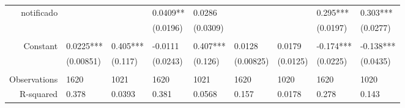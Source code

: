 \begin{tabular}{rrrrrrrrr}
notificado & \multicolumn{1}{l}{} & \multicolumn{1}{l}{} & \multicolumn{1}{l}{0.0409**} & \multicolumn{1}{l}{0.0286} & \multicolumn{1}{l}{} & \multicolumn{1}{l}{} & \multicolumn{1}{l}{0.295***} & \multicolumn{1}{l}{0.303***} \\
      & \multicolumn{1}{l}{} & \multicolumn{1}{l}{} & \multicolumn{1}{l}{(0.0196)} & \multicolumn{1}{l}{(0.0309)} & \multicolumn{1}{l}{} & \multicolumn{1}{l}{} & \multicolumn{1}{l}{(0.0197)} & \multicolumn{1}{l}{(0.0277)} \\
      & \multicolumn{1}{l}{} & \multicolumn{1}{l}{} & \multicolumn{1}{l}{} & \multicolumn{1}{l}{} & \multicolumn{1}{l}{} & \multicolumn{1}{l}{} & \multicolumn{1}{l}{} & \multicolumn{1}{l}{} \\
Constant & \multicolumn{1}{l}{0.0225***} & \multicolumn{1}{l}{0.405***} & \multicolumn{1}{l}{-0.0111} & \multicolumn{1}{l}{0.407***} & \multicolumn{1}{l}{0.0128} & \multicolumn{1}{l}{0.0179} & \multicolumn{1}{l}{-0.174***} & \multicolumn{1}{l}{-0.138***} \\
      & \multicolumn{1}{l}{(0.00851)} & \multicolumn{1}{l}{(0.117)} & \multicolumn{1}{l}{(0.0243)} & \multicolumn{1}{l}{(0.126)} & \multicolumn{1}{l}{(0.00825)} & \multicolumn{1}{l}{(0.0125)} & \multicolumn{1}{l}{(0.0225)} & \multicolumn{1}{l}{(0.0435)} \\
      & \multicolumn{1}{l}{} & \multicolumn{1}{l}{} & \multicolumn{1}{l}{} & \multicolumn{1}{l}{} & \multicolumn{1}{l}{} & \multicolumn{1}{l}{} & \multicolumn{1}{l}{} & \multicolumn{1}{l}{} \\
Observations & \multicolumn{1}{l}{1620} & \multicolumn{1}{l}{1021} & \multicolumn{1}{l}{1620} & \multicolumn{1}{l}{1021} & \multicolumn{1}{l}{1620} & \multicolumn{1}{l}{1020} & \multicolumn{1}{l}{1620} & \multicolumn{1}{l}{1020} \\
R-squared & \multicolumn{1}{l}{0.378} & \multicolumn{1}{l}{0.0393} & \multicolumn{1}{l}{0.381} & \multicolumn{1}{l}{0.0568} & \multicolumn{1}{l}{0.157} & \multicolumn{1}{l}{0.0178} & \multicolumn{1}{l}{0.278} & \multicolumn{1}{l}{0.143} \\
\bottomrule
\end{tabular}%
